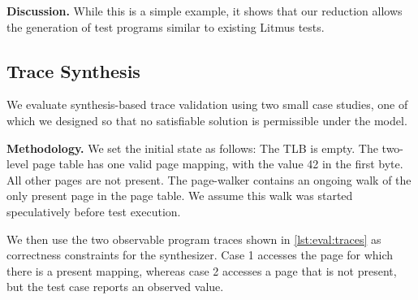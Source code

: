 \noindent\textbf{Discussion.} 
While this is a simple example, it shows that our reduction allows the generation of test programs similar to existing Litmus tests.


\subsection{Trace Synthesis}
We evaluate synthesis-based trace validation using two small case studies, one of which we designed so that no satisfiable solution is permissible under the model.

\noindent\textbf{Methodology.}
We set the initial state as follows:
The TLB is empty. The two-level page table has one valid page mapping, with the value 42 in the first byte. All other pages are not present. The page-walker contains an ongoing walk of the only present page in the page table. We assume this walk was started speculatively before test execution.

We then use the two observable program traces shown in \autoref{lst:eval:traces} as correctness constraints for the synthesizer. Case 1 accesses the page for which there is a present mapping, whereas case 2 accesses a page that is not present, but the test case reports an observed value.

    
    
    

